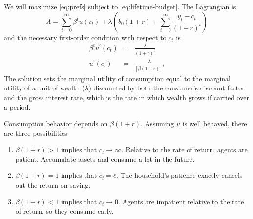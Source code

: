 \documentclass[11pt,pdftex,twoside,letterpaper]{exam}
\begin{document}
We will maximize \eqref{eq:prefs} subject to \eqref{eq:lifetime-budget}. The Lagrangian is
\begin{equation}\label{eq:lagrangian}
  \Lambda = \sum_{t=0}^{\infty} \beta^t u\left(c_t\right) + \lambda \left(b_0(1+r) + \sum_{t=0}^{\infty}\frac{y_t-c_t}{(1+r)^t}\right)
\end{equation}
and the necessary first-order condition with respect to $c_t$ is
\begin{eqnarray}
  \beta^tu^\prime(c_t)&=&\frac{\lambda}{(1+r)^t}\\
  u^\prime(c_t)&=&\frac{\lambda}{[\beta(1+r)]^t}
\end{eqnarray}
The  solution sets the marginal utility of consumption equal to the marginal utility of a unit of wealth ($\lambda$) discounted by both the consumer's discount factor and the gross interest rate, which is the rate in which wealth grows if carried over a period.

Consumption behavior depends on $\beta(1+r)$. Assuming $u$ is well behaved, there are three possibilities
\begin{enumerate}
  \item $\beta(1+r)>1$ implies that $c_t\rightarrow \infty$. Relative to the rate of return, agents are patient. Accumulate assets and consume a lot in the future.
  \item $\beta(1+r)=1$ implies that $c_t = \bar{c}$. The household's patience exactly cancels out the return on saving.
  \item $\beta(1+r)<1$ implies that $c_t\rightarrow 0$. Agents are impatient relative to the rate of return, so they consume early.
\end{enumerate}
\end{document}
